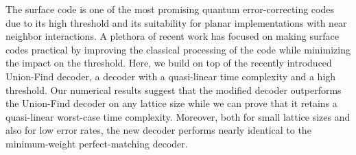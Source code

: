 The surface code is one of the most promising quantum error-correcting codes due to its high threshold and its suitability for planar implementations with near neighbor interactions. A plethora of recent work has focused on making surface codes practical by improving the classical processing of the code while minimizing the impact on the threshold. Here, we build on top of the recently introduced Union-Find decoder, a decoder with a quasi-linear time complexity and a high threshold. Our numerical results suggest that the modified decoder outperforms the Union-Find decoder on any lattice size while we can prove that it retains a quasi-linear worst-case time complexity. Moreover, both for small lattice sizes and also for low error rates, the new decoder performs nearly identical to the minimum-weight perfect-matching decoder.

